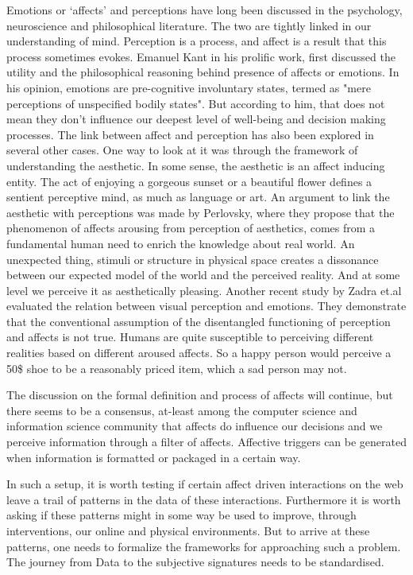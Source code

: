 Emotions or `affects' and perceptions have long been discussed in the psychology, neuroscience and philosophical literature. The two are tightly linked in our understanding of mind. Perception is a process, and affect is a result that this process sometimes evokes.  
Emanuel Kant in his prolific work, first discussed the utility and the philosophical reasoning behind presence of affects or emotions\cite{kant1987critique}. In his opinion, emotions are pre-cognitive involuntary states, termed as "mere perceptions of unspecified bodily states"\cite{borges2004can}. 
But according to him, that does not mean they don't influence our deepest level of well-being and decision making processes.
The link between affect and perception has also been explored in several other cases. One way to look at it was through the framework of understanding the aesthetic. In some sense, the aesthetic is an affect inducing entity. The act of enjoying a gorgeous sunset or a beautiful flower defines a sentient perceptive mind, as much as language or art.  
An argument to link the aesthetic with perceptions was made by Perlovsky\cite{perlovsky2014aesthetic}, where they propose that the phenomenon of affects arousing from perception of aesthetics, comes from a fundamental human need to enrich the knowledge about real world. An unexpected thing, stimuli or structure in physical space creates a dissonance between our expected model of the world and the perceived reality. And at some level we perceive it as aesthetically pleasing. Another recent study by Zadra et.al\cite{zadra2011emotion} evaluated the relation between visual perception and emotions. They demonstrate that the conventional assumption of the disentangled functioning of perception and affects is not true. Humans are quite susceptible to perceiving different realities based on different aroused affects. So a happy person would perceive a 50\$ shoe to be a reasonably priced item, which a sad person may not. 

The discussion on the formal definition and process of affects will continue, but there seems to be a consensus, at-least among the computer science and information science community that affects do influence our decisions and we perceive information through a filter of affects. Affective triggers can be generated when information is formatted or packaged in a certain way. 

In such a setup, it is worth testing if certain affect driven interactions on the web leave a trail of patterns in the data of these interactions. Furthermore it is worth asking if these patterns might in some way be used to improve, through interventions, our online and physical environments. But to arrive at these patterns, one needs to formalize the frameworks for approaching such a problem. 
The journey from Data to the subjective signatures needs to be standardised. 

